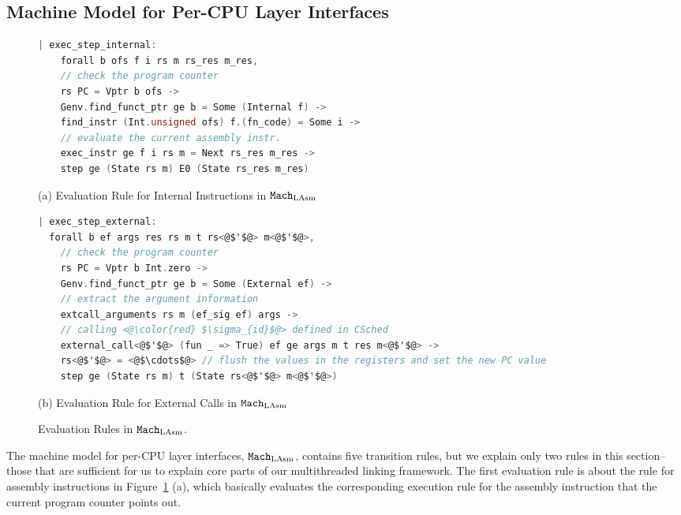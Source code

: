 \subsection{Machine Model for Per-CPU Layer Interfaces}
\label{chapter:linking:subsec:cpu-local-layer-interfaces}


\begin{figure}
\begin{lstlisting}[language=C, deletekeywords={unsigned, struct}]
| exec_step_internal:
    forall b ofs f i rs m rs_res m_res,
    // check the program counter
    rs PC = Vptr b ofs ->
    Genv.find_funct_ptr ge b = Some (Internal f) ->
    find_instr (Int.unsigned ofs) f.(fn_code) = Some i ->
    // evaluate the current assembly instr.         
    exec_instr ge f i rs m = Next rs_res m_res ->
    step ge (State rs m) E0 (State rs_res m_res)
\end{lstlisting}
\begin{center}
(a) Evaluation Rule for Internal Instructions in ${\mathrm{\texttt{Mach}}}_{\mathrm{LAsm}}$
\end{center}
\begin{lstlisting}[language=C]
| exec_step_external:
  forall b ef args res rs m t rs<@$'$@> m<@$'$@>,
    // check the program counter  
    rs PC = Vptr b Int.zero ->
    Genv.find_funct_ptr ge b = Some (External ef) ->
    // extract the argument information
    extcall_arguments rs m (ef_sig ef) args ->
    // calling <@\color{red} $\sigma_{id}$@> defined in CSched
    external_call<@$'$@> (fun _ => True) ef ge args m t res m<@$'$@> ->
    rs<@$'$@> = <@$\cdots$@> // flush the values in the registers and set the new PC value
    step ge (State rs m) t (State rs<@$'$@> m<@$'$@>)
\end{lstlisting}
\begin{center}
(b) Evaluation Rule for External Calls in ${\mathrm{\texttt{Mach}}}_{\mathrm{LAsm}}$
\end{center}
\caption{Evaluation Rules in ${\mathrm{\texttt{Mach}}}_{\mathrm{LAsm}}$.}
\label{fig:chapter:linking:eval-rule-in-lasm}
\end{figure}

The machine model for per-CPU  layer interfaces,
${\mathrm{\texttt{Mach}}}_{\mathrm{LAsm}}$, contains five transition rules, 
but we explain only two rules in this section--those
that are sufficient for us to explain core parts of our multithreaded linking framework.
The first evaluation rule is 
about the rule for assembly instructions in Figure~\ref{fig:chapter:linking:eval-rule-in-lasm} (a), 
which basically evaluates the corresponding execution 
rule for the assembly instruction that the current program counter points out. 

